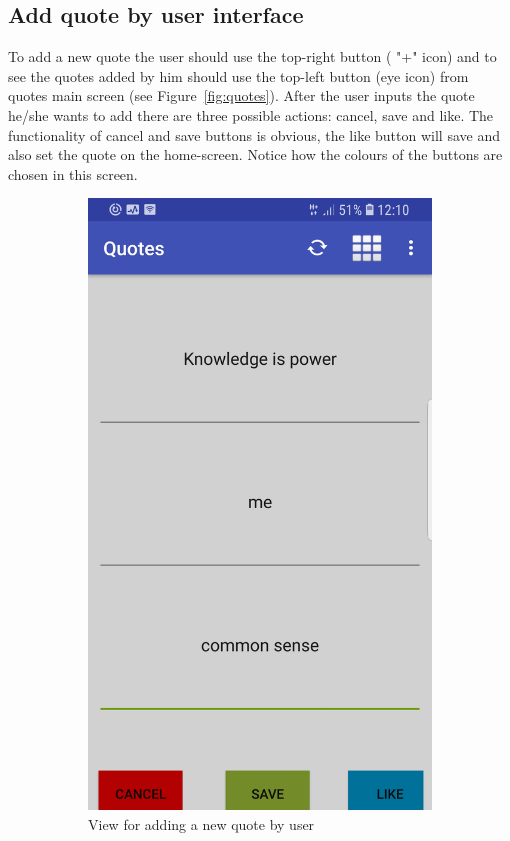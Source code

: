 \documentclass[version=last,fontsize=13pt]{scrartcl}
\begin{document}
\subsection{Add quote by user interface}
	To add a new quote the user should use the top-right button ( "+" icon) and to see the quotes added by him should use the top-left button (eye icon) from quotes main screen (see Figure~\ref{fig:quotes}). After the user inputs the quote he/she wants to add there are three possible actions: cancel, save and like. The functionality of cancel and save buttons is obvious, the like button will save and also set the quote on the home-screen. Notice how the colours of the buttons are chosen in this screen. 	

\begin{figure}[H]
\centering
\begin{subfigure}{.55\textwidth}
  \centering
  \includegraphics[width=.5\linewidth]{imgs/AddQuote.jpg}
  \caption{View for adding a new quote by user}
  \label{fig:subAddQ}
\end{subfigure}%
\begin{subfigure}{.55\textwidth}
  \centering

\end{subfigure}
\end{figure}
\end{document}
